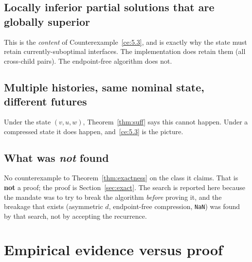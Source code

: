 \documentclass[11pt]{article}
\theoremstyle{plain}
\begin{document}
\subsection{Locally inferior partial solutions that are globally superior}

This is the \emph{content} of Counterexample~\ref{ce:5.3}, and is exactly why
the state must retain currently-suboptimal interfaces. The implementation does
retain them (all cross-child pairs). The endpoint-free algorithm does not.

\subsection{Multiple histories, same nominal state, different futures}

Under the state \((v,u,w)\), Theorem~\ref{thm:suff} says this cannot happen.
Under a compressed state it does happen, and~\ref{ce:5.3} is the picture.

\subsection{What was \emph{not} found}

No counterexample to Theorem~\ref{thm:exactness} on the class it claims. That
is \textbf{not} a proof; the proof is Section~\ref{sec:exact}. The search is
reported here because the mandate was to try to break the algorithm
\emph{before} proving it, and the breakage that exists (asymmetric \(d\),
endpoint-free compression, \texttt{NaN}) was found by that search, not by
accepting the recurrence.

\section{Empirical evidence versus proof}
\end{document}
